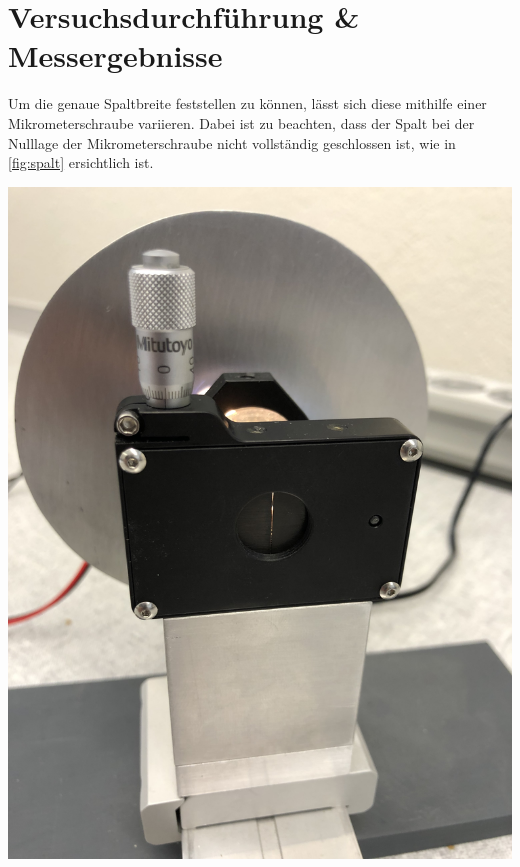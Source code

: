 \documentclass[11pt,ngerman]{scrartcl}
\begin{document}
\section{Versuchsdurchführung \& Messergebnisse}\label{sec:Versuchsdurchführung}

Um die genaue Spaltbreite feststellen zu können, lässt sich diese mithilfe einer Mikrometerschraube variieren. Dabei ist zu beachten, dass der Spalt bei der Nulllage der Mikrometerschraube nicht vollständig geschlossen ist, wie in \autoref{fig:spalt} ersichtlich ist.

\begin{center}
	\begin{minipage}[t]{0.5\textwidth}
		\centering
		\includegraphics[angle = -90, width=\textwidth]{spalt}
		\label{fig:spalt}
	\end{minipage}
\end{center}
\end{document}
